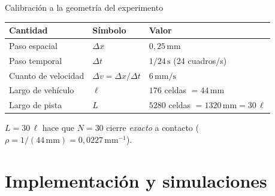\documentclass[10pt,aspectratio=169]{beamer}
\newcommand{\unit}[1]{\,\mathrm{#1}}
\begin{document}
\begin{frame}{Calibración a la geometría del experimento}
\centering
\begin{tabular}{lll}
\toprule
Cantidad & Símbolo & Valor \\
\midrule
Paso espacial & $\Delta x$ & $0{,}25\unit{mm}$ \\
Paso temporal & $\Delta t$ & $1/24\unit{s}$ (24 cuadros/s) \\
Cuanto de velocidad & $\Delta v=\Delta x/\Delta t$ & $6\unit{mm/s}$ \\
Largo de vehículo & $\ell$ & $176$ celdas $=44\unit{mm}$ \\
Largo de pista & $L$ & $5280$ celdas $=1320\unit{mm}=30\,\ell$ \\
\bottomrule
\end{tabular}
\vfill
{\footnotesize $L=30\,\ell$ hace que $N=30$ cierre \emph{exacto} a contacto ($\rho=1/(44\unit{mm})=0{,}0227\unit{mm^{-1}}$).}
\end{frame}

\section{Implementación y simulaciones}
\end{document}

